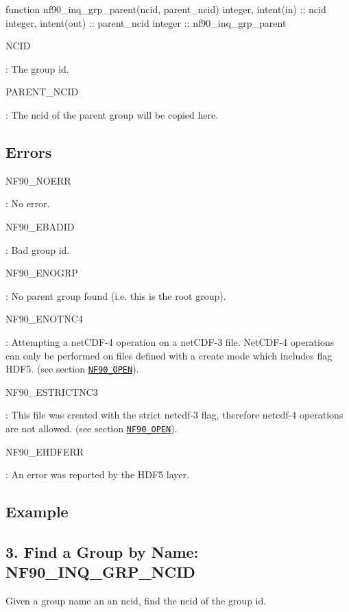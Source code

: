 \begin{DoxyCode}
\textcolor{keyword}{function }nf90\_inq\_grp\_parent(ncid, parent\_ncid)
  \textcolor{keywordtype}{integer}, \textcolor{keywordtype}{intent(in)} :: ncid
  \textcolor{keywordtype}{integer}, \textcolor{keywordtype}{intent(out)} :: parent\_ncid
  \textcolor{keywordtype}{integer} :: nf90\_inq\_grp\_parent
\end{DoxyCode}


{\ttfamily N\+C\+ID}

\+: The group id.

{\ttfamily P\+A\+R\+E\+N\+T\+\_\+\+N\+C\+ID}

\+: The ncid of the parent group will be copied here.

\subsection*{Errors}

{\ttfamily N\+F90\+\_\+\+N\+O\+E\+RR}

\+: No error.

{\ttfamily N\+F90\+\_\+\+E\+B\+A\+D\+ID}

\+: Bad group id.

{\ttfamily N\+F90\+\_\+\+E\+N\+O\+G\+RP}

\+: No parent group found (i.\+e. this is the root group).

{\ttfamily N\+F90\+\_\+\+E\+N\+O\+T\+N\+C4}

\+: Attempting a net\+C\+D\+F-\/4 operation on a net\+C\+D\+F-\/3 file. Net\+C\+D\+F-\/4 operations can only be performed on files defined with a create mode which includes flag H\+D\+F5. (see section \href{#NF90_005fOPEN}{\tt N\+F90\+\_\+\+O\+P\+EN}).

{\ttfamily N\+F90\+\_\+\+E\+S\+T\+R\+I\+C\+T\+N\+C3}

\+: This file was created with the strict netcdf-\/3 flag, therefore netcdf-\/4 operations are not allowed. (see section \href{#NF90_005fOPEN}{\tt N\+F90\+\_\+\+O\+P\+EN}).

{\ttfamily N\+F90\+\_\+\+E\+H\+D\+F\+E\+RR}

\+: An error was reported by the H\+D\+F5 layer.

\subsection*{Example}\hypertarget{f90_groups_f90-find-a-group-by-name-nf90_inq_grp_ncid}{}\subsection{3. Find a Group by Name\+: N\+F90\+\_\+\+I\+N\+Q\+\_\+\+G\+R\+P\+\_\+\+N\+C\+I\+D }\label{f90_groups_f90-find-a-group-by-name-nf90_inq_grp_ncid}
Given a group name an an ncid, find the ncid of the group id.

